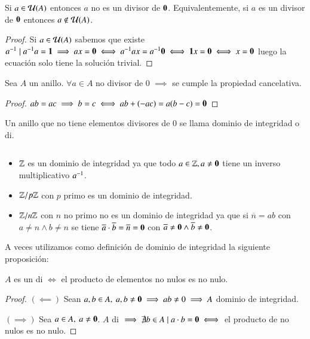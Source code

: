 \begin{pro}
	Si $a \in \mathcal{U}(A)$ entonces $a$ no es un divisor de $\mathbf{0}$. Equivalentemente, si $a$ es un divisor de $\mathbf{0}$ entonces $a \notin \mathcal{U}(A)$.
\end{pro}

\begin{proof}
	Si $a \in \mathcal{U}(A)$ sabemos que existe $a^{-1} \mid a^{-1}a = \mathbf{1} \implies ax = \mathbf{0} \iff a^{-1}ax = a^{-1} \mathbf{0} \iff \mathbf{1} x = \mathbf{0} \iff x = \mathbf{0}$ luego la ecuación solo tiene la solución trivial.
\end{proof}

\begin{pro}
	Sea $A$ un anillo. $\forall a \in A$ no divisor de 0 $\implies$ se cumple la propiedad cancelativa.
\end{pro}

\begin{proof}
	$ab = ac \implies b = c \iff ab + (-ac) = a(b -c) = \mathbf{0}$
\end{proof}

\begin{dfn}
	\label{dfn:dominiointegridad}
	Un anillo que no tiene elementos divisores de 0 se llama dominio de integridad o \gls{di}.
\end{dfn}

\begin{ej}$ $\newline
	\begin{itemize}
		\item $\mathbb{Z}$ es un dominio de integridad ya que todo $a \in \mathbb{Z}, a \neq \mathbf{0}$ tiene un inverso multiplicativo $a^{-1}$.
		\item $\mathbb{Z}/p\mathbb{Z}$ con $p$ primo es un dominio de integridad.
		\item $\mathbb{Z}/n\mathbb{Z}$ con $n$ no primo no es un dominio de integridad ya que si $\overline n = ab$ con $a \neq n \land b \neq n$ se tiene $\overline{a} \cdot \overline{b} = \overline{n} = \mathbf{0}$ con $\overline{a} \neq \mathbf{0} \land \overline{b} \neq \mathbf{0}$.
	\end{itemize}
\end{ej}


A veces utilizamos como definición de dominio de integridad la siguiente proposición:

\begin{pro}
	$A$ es un \gls{di} $\iff$ el producto de elementos no nulos es no nulo.
\end{pro}

\begin{proof}
	$(\impliedby)$ Sean $a,b \in A,\ a,b \neq \mathbf{0} \implies ab \neq 0 \implies A$ dominio de integridad.
	
	$(\implies)$ Sea $a \in A,\ a \neq \mathbf{0}$. $A$ \gls{di} $\implies \nexists b \in A \mid a\cdot b = \mathbf{0} \iff$ el producto de no nulos es no nulo.
\end{proof}

